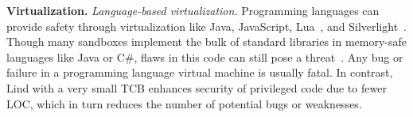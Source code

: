 

\textbf{Virtualization.}
\textit{Language-based virtualization.}
Programming languages can provide safety through virtualization like
Java, JavaScript, Lua~\cite{Lua}, and Silverlight~\cite{Silverlight}. 
%
%
%
Though many sandboxes implement the bulk of standard libraries in
memory-safe languages like Java or C\#, flaws in this code can
still pose a threat~\cite{JavaBugs, Java-Lessons}. 
Any bug or failure in a programming language virtual
machine is usually fatal. In contrast, Lind with a very small TCB
enhances security of privileged code due to fewer LOC, which in 
turn reduces the number of potential bugs or weaknesses. %

